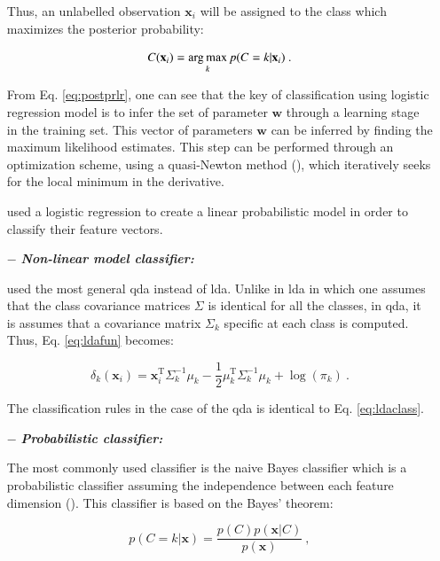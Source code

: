 \begin{enumerate}[leftmargin=*]
Thus, an unlabelled observation $\mathbf{x}_i$ will be assigned to the class which maximizes the posterior probability:

\begin{equation}
	C(\mathbf{x}_i) = \operatorname*{arg\,max}_k p(C=k|\mathbf{x}_i) \ .
	\label{eq:posprobreg}
\end{equation}

From Eq. \eqref{eq:postprlr}, one can see that the key of classification using logistic regression model is to infer the set of parameter $\mathbf{w}$ through a learning stage in the training set. This vector of parameters $\mathbf{w}$ can be inferred by finding the maximum likelihood estimates. This step can be performed through an optimization scheme, using a quasi-Newton method (\cite{Byrd1995}), which iteratively seeks for the local minimum in the derivative.

\cite{Kelm2007,Puech2009} used a logistic regression to create a linear probabilistic model in order to classify their feature vectors.

\item[$-$] \textbf{\textit{Non-linear model classifier:}} 

\cite{Viswanath2012} used the most general \acf{qda} instead of \ac{lda}. Unlike in \ac{lda} in which one assumes that the class covariance matrices $\Sigma$ is identical for all the classes, in \ac{qda}, it is assumes that a covariance matrix $\Sigma_k$ specific at each class is computed. Thus, Eq. \eqref{eq:ldafun} becomes:

\begin{equation}
	\delta_{k}(\mathbf{x}_i) = \mathbf{x}_i^{\text{T}} \Sigma_{k}^{-1} \mu_k - \frac{1}{2} \mu_{k}^{\text{T}} \Sigma_{k}^{-1} \mu_k + \log (\pi_k) \ .
	\label{eq:qdafun}
\end{equation}

The classification rules in the case of the \ac{qda} is identical to Eq. \eqref{eq:ldaclass}.

\item[$-$] \textbf{\textit{Probabilistic classifier:}}

The most commonly used classifier is the naive Bayes classifier which is a probabilistic classifier assuming the independence between each feature dimension (\cite{Rish2001}). This classifier is based on the Bayes' theorem:

\begin{equation}
	p(C=k|\mathbf{x}) = \frac{p(C)p(\mathbf{x}|C)}{p(\mathbf{x})} \ ,
	\label{eq:bayth}
\end{equation}


\end{enumerate}
